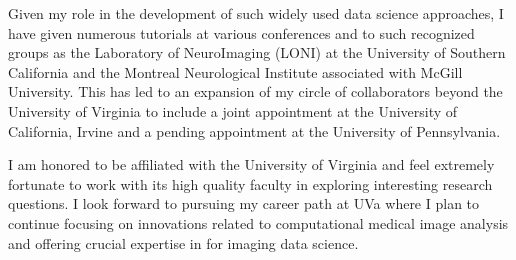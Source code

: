 \documentclass[12pt,]{article}
\begin{document}
Given my role in the development of such widely used data science
approaches, I have given numerous tutorials at various conferences and
to such recognized groups as the Laboratory of NeuroImaging (LONI) at
the University of Southern California and the Montreal Neurological
Institute associated with McGill University. This has led to an
expansion of my circle of collaborators beyond the University of
Virginia to include a joint appointment at the University of California,
Irvine and a pending appointment at the University of Pennsylvania.

I am honored to be affiliated with the University of Virginia and feel
extremely fortunate to work with its high quality faculty in exploring
interesting research questions. I look forward to pursuing my career
path at UVa where I plan to continue focusing on innovations related to
computational medical image analysis and offering crucial expertise in
for imaging data science.
\end{document}
